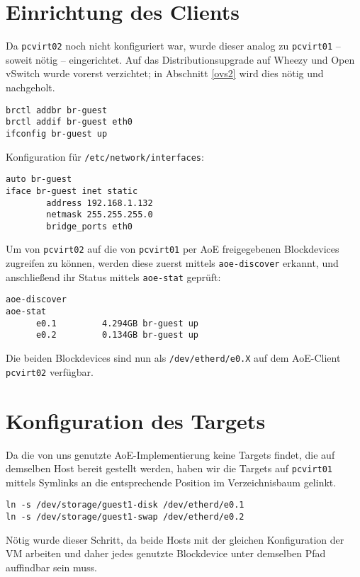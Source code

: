 \section{Einrichtung des Clients}
Da \verb#pcvirt02# noch nicht konfiguriert war, wurde dieser analog zu \verb#pcvirt01#  -- soweit nötig -- eingerichtet. Auf das Distributionsupgrade auf Wheezy und Open vSwitch wurde vorerst verzichtet; in Abschnitt \ref{ovs2} wird dies nötig und nachgeholt.
\begin{verbatim}
brctl addbr br-guest
brctl addif br-guest eth0
ifconfig br-guest up
\end{verbatim}
Konfiguration für \verb#/etc/network/interfaces#:
\setupVerbatimOut
\begin{verbatim}
auto br-guest
iface br-guest inet static
        address 192.168.1.132
        netmask 255.255.255.0
        bridge_ports eth0
\end{verbatim}

Um von \verb#pcvirt02# auf die von \verb#pcvirt01# per AoE freigegebenen Blockdevices zugreifen zu können, werden diese zuerst mittels \verb#aoe-discover# erkannt, und anschließend ihr Status mittels \verb#aoe-stat# geprüft:
\setupVerbatimOut
\begin{verbatim}
aoe-discover 
aoe-stat 
      e0.1         4.294GB br-guest up 
      e0.2         0.134GB br-guest up  
\end{verbatim}

Die beiden Blockdevices sind nun als \verb#/dev/etherd/e0.X# auf dem AoE-Client \verb#pcvirt02# verfügbar.

\section{Konfiguration des Targets}\label{dirtysym}
Da die von uns genutzte AoE-Implementierung keine Targets findet, die auf demselben Host bereit gestellt werden, haben wir die Targets auf \verb#pcvirt01# mittels Symlinks an die entsprechende Position im Verzeichnisbaum gelinkt.
\setupVerbatimOut
\begin{verbatim}
ln -s /dev/storage/guest1-disk /dev/etherd/e0.1
ln -s /dev/storage/guest1-swap /dev/etherd/e0.2 
\end{verbatim}

Nötig wurde dieser Schritt, da beide Hosts mit der gleichen Konfiguration der VM arbeiten und daher jedes genutzte Blockdevice unter demselben Pfad auffindbar sein muss.

